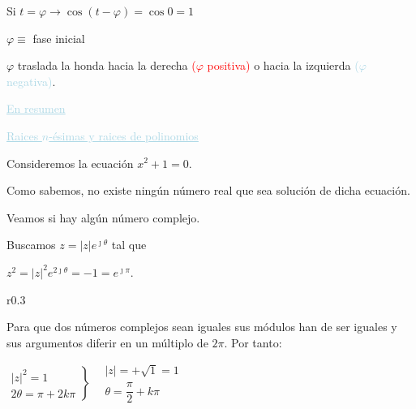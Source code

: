 \documentclass[12pt]{article}
\begin{document}
Si $t=\varphi\longrightarrow\cos(t-\varphi)=\cos0=1$

$\varphi\equiv$ fase inicial

$\varphi$ traslada la honda hacia la derecha
\textcolor{red}{($\varphi$ positiva)} o hacia la izquierda
\textcolor{lightblue}{($\varphi$ negativa)}.

\textcolor{lightblue}{\underline{En resumen}}


\textcolor{lightblue}{\underline{Raices $n$-ésimas y raices de
polinomios}}

Consideremos la ecuación $x^2+1=0$.

Como sabemos, no existe ningún número real que sea solución de
dicha ecuación.

Veamos si hay algún número complejo.

Buscamos $z=|z|e^{\jmath\theta}$ tal que

\hspace{2cm}$z^2=|z|^2e^{2\jmath\theta}=-1=e^{\jmath\pi}$.

\begin{wrapfigure}{r}{0.3\textwidth}
\end{wrapfigure}

Para que dos números complejos sean iguales sus módulos han de
ser iguales y sus argumentos diferir en un múltiplo de $2\pi$.
Por tanto:

$\left.\begin{array}{r}
        |z|^2=1 \\
        2\theta=\pi+2k\pi
    \end{array}\right\}~~~~\begin{array}{l}
        |z|=+\sqrt{1}=1 \\
        \theta=\dfrac{\pi}{2}+k\pi
    \end{array}$
\end{document}
